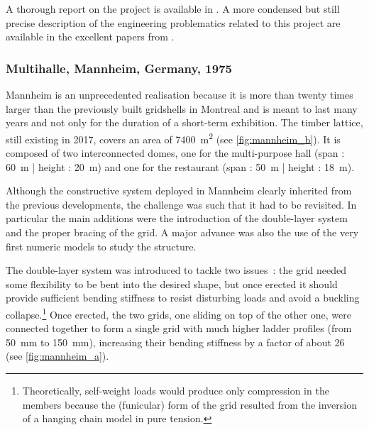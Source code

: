 A thorough report on the project is available in \cite{IL13}.  A more condensed but still precise description of the engineering problematics related to this project are available in the excellent papers from \citet{Happold1975, Liddell2015}.

\subsubsection{Multihalle, Mannheim, Germany, 1975}
Mannheim is an unprecedented realisation because it is more than twenty times larger than the previously built gridshells in Montreal and is meant to last many years and not only for the duration of a short-term exhibition. The timber lattice, still existing in 2017,  covers an area of \SI{7400}{m^2} (see \cref{fig:mannheim_b}). It is composed of two interconnected domes, one for the multi-purpose hall (span : \SI{60}{m} | height : \SI{20}{m}) and one for the restaurant (span : \SI{50}{m} | height : \SI{18}{m}).

Although the constructive system deployed in Mannheim clearly inherited from the previous developments, the challenge was such that it had to be revisited. In particular the main additions were the introduction of the double-layer system and the proper bracing of the grid. A major advance was also the use of the very first numeric models to study the structure.

The double-layer system was introduced to tackle two issues~: the grid needed some flexibility to be bent into the desired shape, but once erected it should provide sufficient bending stiffness to resist disturbing loads and avoid a buckling collapse.\footnote{Theoretically, self-weight loads would produce only compression in the members because the (funicular) form of the grid resulted from the inversion of a hanging chain model in pure tension.} Once erected, the two grids, one sliding on top of the other one, were connected together to form a single grid with much higher ladder profiles (from \SI{50}{mm} to \SI{150}{mm}), increasing their bending stiffness by a factor of about 26 (see \cref{fig:mannheim_a}).

